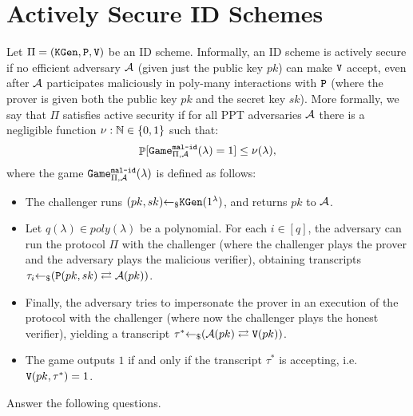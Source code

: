 \section{Actively Secure ID Schemes}
Let $\Pi = (\texttt{KGen}, \texttt{P}, \texttt{V})$ be an ID scheme. Informally, an ID scheme is actively secure if no efficient adversary $\mathcal{A}$ (given just the public key $pk$) can make $\texttt{V}$ accept, even after $\mathcal{A}$ participates maliciously in poly-many interactions with $\texttt{P}$ (where the prover is given both the public key $pk$ and the secret key $sk$). More formally, we say that $\Pi$ satisfies active security if for all PPT adversaries $\mathcal{A}$ there is a negligible function $\nu: {\mathbb N} \in {\{0, 1\}}$ such that:
\[\mathop{\mathbb P}[\texttt{Game}_{\Pi, \mathcal{A}}^\texttt{mal-id}(\lambda) = 1] \le \nu(\lambda),\]
where the game $\texttt{Game}_{\Pi, \mathcal{A}}^\texttt{mal-id}(\lambda)$ is defined as follows:
\begin{itemize}
	\item The challenger runs $(pk, sk) {\leftarrow_\$} \texttt{KGen}(1^\lambda)$, and returns $pk$ to $\mathcal{A}$.
	\item Let $q(\lambda) \in poly(\lambda)$ be a polynomial. For each $i \in [q]$, the adversary can run the protocol $\Pi$ with the challenger (where the challenger plays the prover and the adversary plays the malicious verifier), obtaining transcripts $\tau_i {\leftarrow_\$} (\texttt{P}(pk, sk) \rightleftarrows \mathcal{A}(pk))$.
	\item Finally, the adversary tries to impersonate the prover in an execution of the protocol with the challenger (where now the challenger plays the honest verifier), yielding a transcript $\tau^* {\leftarrow_\$} (\mathcal{A}(pk) \rightleftarrows \texttt{V}(pk))$.
	\item The game outputs $1$ if and only if the transcript $\tau^*$ is accepting, i.e. $\texttt{V}(pk, \tau^*) = 1$.
\end{itemize}
Answer the following questions.
